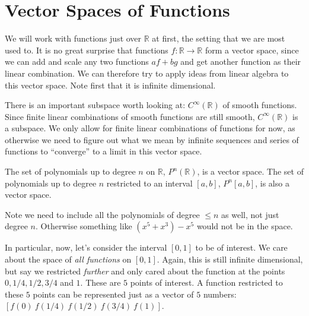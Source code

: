 \documentclass[../master.tex]{subfiles}
\begin{document}


\section{Vector Spaces of Functions} %
\label{sec:vector_spaces_of_functions}



	We will work with functions just over $\mathbb R$ at first, the setting that we are most used to. It is no great surprise that functions $f:\mathbb{R} \rightarrow \mathbb R$ form a vector space, since we can add and scale any two functions $a f + b g$ and get another function as their linear combination. We can therefore try to apply ideas from linear algebra to this vector space. Note first that it is infinite dimensional. 
	
	There is an important subspace worth looking at: $C^{\infty} (\mathbb R)$ of smooth functions. Since finite linear combinations of smooth functions are still smooth, $C^{\infty} (\mathbb R)$ is a subspace. We only allow for finite linear combinations of functions for now, as otherwise we need to figure out what we mean by infinite sequences and series of functions to ``converge'' to a limit in this vector space. 
	
	\begin{example}
		The set of polynomials up to degree $n$ on $\mathbb{R}$, $P^n(\mathbb R)$, is a vector space. The set of polynomials up to degree $n$ restricted to an interval $[a,b]$, $P^n[a,b]$, is also a vector space. 
	\end{example}
	Note we need to include all the polynomials of degree $\leq n$ as well, not just degree $n$. Otherwise something like $(x^{5} + x^{3}) - x^{5}$ would not be in the space. 
	
	In particular, now, let's consider the interval $[0,1]$ to be of interest. We care about the space of \emph{all functions} on $[0,1]$. Again, this is still infinite dimensional, but say we restricted \emph{further} and only cared about the function at the points $0, 1/4, 1/2, 3/4$ and $1$. These are $5$ points of interest. A function restricted to these $5$ points can be represented just as a vector of $5$ numbers: $[f(0) ~ f(1/4) ~ f(1/2) ~ f(3/4) ~ f(1)]$.
	
\end{document}

